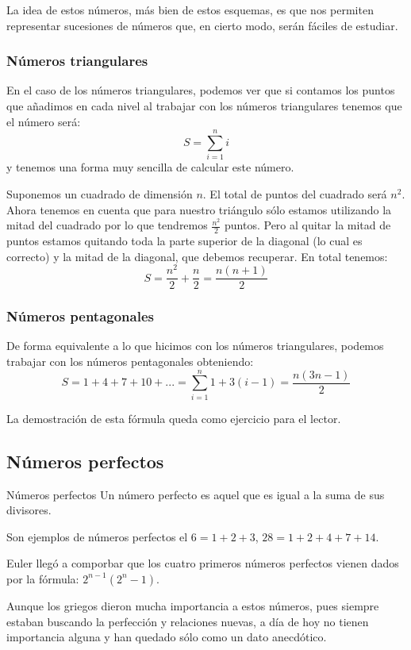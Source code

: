 \documentclass{apuntes}
\begin{document}
La idea de estos números, más bien de estos esquemas, es que nos permiten representar sucesiones de números que, en cierto modo, serán fáciles de estudiar. 


\subsubsection{Números triangulares}
En el caso de los números triangulares, podemos ver que si contamos los puntos que añadimos en cada nivel al trabajar con los números triangulares tenemos que el número será:
\[S=\sum_{i=1}^ni\]
y tenemos una forma muy sencilla de calcular este número.

Suponemos un cuadrado de dimensión $n$. El total de puntos del cuadrado será $n^2$. Ahora tenemos en cuenta que para nuestro triángulo sólo estamos utilizando la mitad del cuadrado por lo que tendremos $\frac{n^2}{2}$ puntos. Pero al quitar la mitad de puntos estamos quitando toda la parte superior de la diagonal (lo cual es correcto) y la mitad de la diagonal, que debemos recuperar. En total tenemos:
\[S=\frac{n^2}{2}+\frac{n}{2} = \frac{n(n+1)}{2}\]

\subsubsection{Números pentagonales}
 De forma equivalente a lo que hicimos con los números triangulares, podemos trabajar con los números pentagonales obteniendo:
\[S = 1+4+7+10 + ... = \sum_{i=1}^n1+3(i-1) = \frac{n(3n-1)}{2}\]

La demostración de esta fórmula queda como ejercicio para el lector.

\subsection{Números perfectos}
\begin{defn}{Números perfectos}
Un número perfecto es aquel que es igual a la suma de sus divisores.

Son ejemplos de números perfectos el $6=1+2+3$, $28=1+2+4+7+14$.
\end{defn}

Euler llegó a comporbar que los cuatro primeros números perfectos vienen dados por la fórmula: $2^{n-1}(2^n-1)$.

Aunque los griegos dieron mucha importancia a estos números, pues siempre estaban buscando la perfección y relaciones nuevas, a día de hoy no tienen importancia alguna y han quedado sólo como un dato anecdótico.
\end{document}
